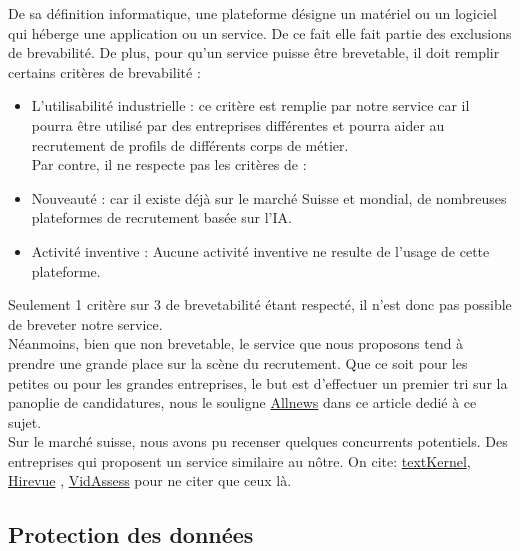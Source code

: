 De sa définition informatique, une plateforme désigne un matériel ou un logiciel qui héberge une application ou un service. De ce fait elle fait partie des exclusions de brevabilité. De plus, pour qu'un service puisse être brevetable, il doit remplir certains critères de brevabilité : 
 \begin{itemize}
     \item L'utilisabilité industrielle : ce critère est remplie par notre service car il pourra être utilisé par des entreprises différentes et pourra aider au recrutement de profils de différents corps de métier. \\
     Par contre, il ne respecte pas les critères de :
     \item Nouveauté : car il existe déjà sur le marché Suisse et mondial, de nombreuses plateformes de recrutement basée sur l'IA.
     \item Activité inventive : Aucune activité inventive ne resulte de l'usage de cette plateforme. 
 \end{itemize}
Seulement 1 critère sur 3 de brevetabilité étant respecté, il n'est donc pas possible de breveter notre service. \\
Néanmoins, bien que non brevetable, le service que nous proposons tend à prendre une grande place sur la scène du recrutement. Que ce soit pour les petites ou pour les grandes entreprises, le but est d'effectuer un premier tri sur la panoplie de candidatures, nous le souligne \href{https://www.allnews.ch/content/points-de-vue/intelligence-artificielle-et-recrutement}{Allnews} dans ce article dedié à ce sujet.  \\ 
 Sur le marché suisse, nous avons pu recenser quelques concurrents potentiels. Des entreprises qui proposent un service similaire au nôtre. On cite: \href{https://www.textkernel.com/fr/?utm_term=recrutement%20intelligence%20artificielle&utm_source=adwords&utm_campaign=FR+-+Search+-+Non+Brand&utm_medium=ppc&hsa_mt=p&hsa_src=g&hsa_kw=recrutement%20intelligence%20artificielle&hsa_ad=629928942899&hsa_tgt=kwd-541674329900&hsa_ver=3&hsa_acc=1393423699&hsa_net=adwords&hsa_cam=18670126951&hsa_grp=144320914202&gclid=CjwKCAiA5Y6eBhAbEiwA_2ZWISLyh3zdDh-KHgpPZ955DcROOiNeKEdHtwnNKpShXb0kbDMqB6jNvRoCTYwQAvD_BwE}{textKernel}, \href{https://www.hirevue.com/}{Hirevue} , \href{https://assessment.aon.com/en-us/video-interviewing-solution}{VidAssess} pour ne citer que ceux là. 


\subsection{Protection des données}

